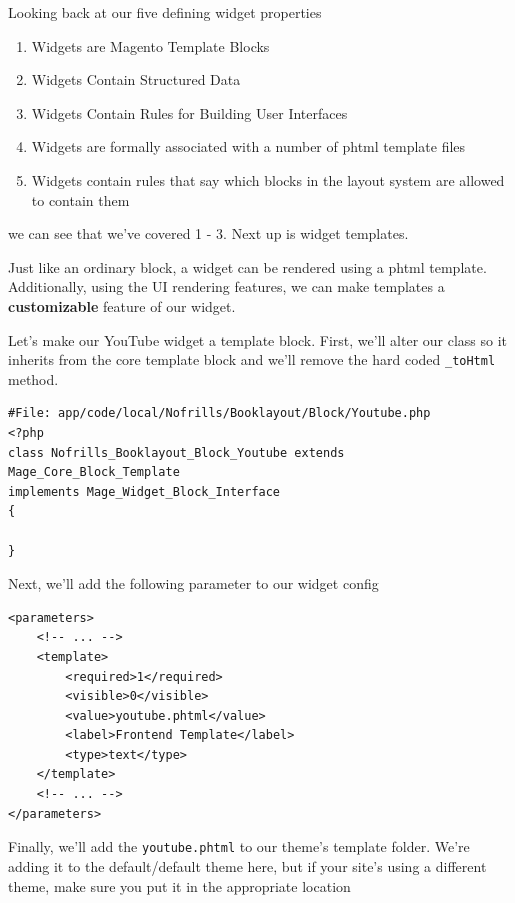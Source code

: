 \documentclass[oneside]{book}
\begin{document}
Looking back at our five defining widget properties

\begin{enumerate}
\item Widgets are Magento Template Blocks
\item Widgets Contain Structured Data
\item Widgets Contain Rules for Building User Interfaces
\item Widgets are formally associated with a number of phtml template files
\item Widgets contain rules that say which blocks in the layout system are allowed to contain them
\end{enumerate}


we can see that we've covered 1 - 3.  Next up is widget templates.

Just like an ordinary block, a widget can be rendered using a phtml template.  Additionally, using the UI rendering features, we can make templates a \textbf{customizable} feature of our widget.

Let's make our YouTube widget a template block.  First, we'll alter our class so it inherits from the core template block and we'll remove the hard coded \footnotesize\texttt{\_toHtml} \normalsize  method.

\begin{lstlisting}
#File: app/code/local/Nofrills/Booklayout/Block/Youtube.php
<?php
class Nofrills_Booklayout_Block_Youtube extends Mage_Core_Block_Template
implements Mage_Widget_Block_Interface
{

}

\end{lstlisting}


Next, we'll add the following parameter to our widget config

\begin{lstlisting}
<parameters>
    <!-- ... -->
    <template>
        <required>1</required>
        <visible>0</visible>
        <value>youtube.phtml</value>
        <label>Frontend Template</label>
        <type>text</type>
    </template>
    <!-- ... -->
</parameters>

\end{lstlisting}


Finally, we'll add the \footnotesize\texttt{youtube.phtml} \normalsize  to our theme's template folder.  We're adding it to the default/default theme here, but if your site's using a different theme, make sure you put it in the appropriate location
\end{document}
